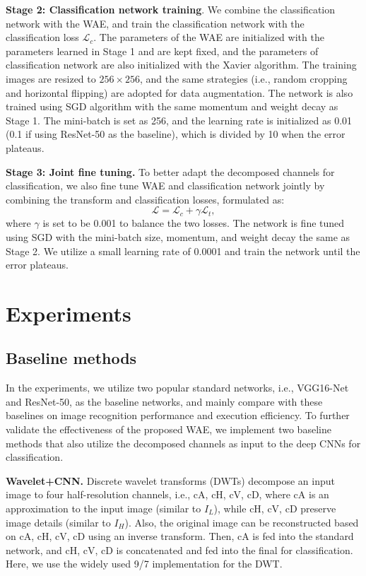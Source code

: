 \documentclass[letterpaper]{article} %
\begin{document}
\noindent\textbf{Stage 2: Classification network training}. We combine the classification network with the WAE, and train the classification network with the classification loss $\mathcal{L}_{{c}}$. The parameters of the WAE are initialized with the parameters learned in Stage 1 and are kept fixed, and the parameters of classification network are also initialized with the Xavier algorithm. The training images are resized to $256 \times 256$, and the same strategies (i.e., random cropping and horizontal flipping) are adopted for data augmentation. The network is also trained using SGD algorithm with the same momentum and weight decay as Stage 1. The mini-batch is set as 256, and the learning rate is initialized as 0.01 (0.1 if using ResNet-50 as the baseline), which is divided by 10 when the error plateaus.

\noindent\textbf{Stage 3: Joint fine tuning.} To better adapt the decomposed channels for classification, we also fine tune WAE and classification network jointly by combining the transform and classification losses, formulated as:
\begin{equation}
\mathcal{L}=\mathcal{L}_c+\gamma\mathcal{L}_t,
\end{equation}
where $\gamma$ is set to be 0.001 to balance the two losses. The network is fine tuned using SGD with the mini-batch size, momentum, and weight decay the same as Stage 2. We utilize a small learning rate of 0.0001 and train the network until the error plateaus.

\section{Experiments}
\subsection{Baseline methods}
In the experiments, we utilize two popular standard networks, i.e., VGG16-Net and ResNet-50, as the baseline networks, and mainly compare with these baselines on image recognition performance and execution efficiency. To further validate the effectiveness of the proposed WAE, we implement two baseline methods that also utilize the decomposed channels as input to the deep CNNs for classification.

\noindent\textbf{Wavelet+CNN. }Discrete wavelet transforms (DWTs) decompose an input image to four half-resolution channels, i.e., cA, cH, cV, cD, where cA is an approximation to the input image (similar to $I_L$), while cH, cV, cD preserve image details (similar to $I_H$). Also, the original image can be reconstructed based on cA, cH, cV, cD using an inverse transform. Then, cA is fed into the standard network, and cH, cV, cD is concatenated and fed into the final for classification. Here, we use the widely used 9/7 implementation \cite{zhang2011fsim} for the DWT.
\end{document}
